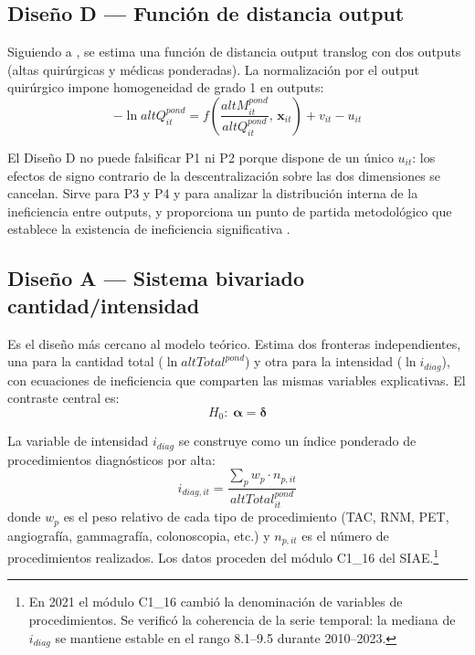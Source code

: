 \documentclass[12pt, a4paper, twoside, openright]{book}
\newcommand{\bsym}[1]{\boldsymbol{#1}}
\theoremstyle{plain}
\theoremstyle{definition}
\theoremstyle{remark}
\begin{document}
\subsection{Diseño D --- Función de distancia output}

Siguiendo a \citet{coelli1999}, se estima una función de distancia output translog con dos outputs (altas quirúrgicas y médicas ponderadas). La normalización por el output quirúrgico impone homogeneidad de grado 1 en outputs:
\begin{equation}
  -\ln altQ^{pond}_{it} = f\!\left(\frac{altM^{pond}_{it}}{altQ^{pond}_{it}},\, \mathbf{x}_{it}\right) + v_{it} - u_{it}
  \label{eq:odf}
\end{equation}

El Diseño D no puede falsificar P1 ni P2 porque dispone de un único $u_{it}$: los efectos de signo contrario de la descentralización sobre las dos dimensiones se cancelan. Sirve para P3 y P4 y para analizar la distribución interna de la ineficiencia entre outputs, y proporciona un punto de partida metodológico que establece la existencia de ineficiencia significativa \citep{coelli2005}.

\subsection{Diseño A --- Sistema bivariado cantidad/intensidad}

Es el diseño más cercano al modelo teórico. Estima dos fronteras independientes, una para la cantidad total ($\ln altTotal^{pond}$) y otra para la intensidad ($\ln i_{diag}$), con ecuaciones de ineficiencia que comparten las mismas variables explicativas. El contraste central es:
\begin{equation}
  H_0:\; \bsym{\alpha} = \bsym{\delta}
  \label{eq:h0_pstar}
\end{equation}

La variable de intensidad $i_{diag}$ se construye como un índice ponderado de procedimientos diagnósticos por alta:
\begin{equation}
  i_{diag,it} = \frac{\sum_p w_p \cdot n_{p,it}}{altTotal^{pond}_{it}}
  \label{eq:i_diag}
\end{equation}
donde $w_p$ es el peso relativo de cada tipo de procedimiento (TAC, RNM, PET, angiografía, gammagrafía, colonoscopia, etc.) y $n_{p,it}$ es el número de procedimientos realizados. Los datos proceden del módulo C1\_16 del SIAE.\footnote{En 2021 el módulo C1\_16 cambió la denominación de variables de procedimientos. Se verificó la coherencia de la serie temporal: la mediana de $i_{diag}$ se mantiene estable en el rango 8.1--9.5 durante 2010--2023.}
\end{document}
